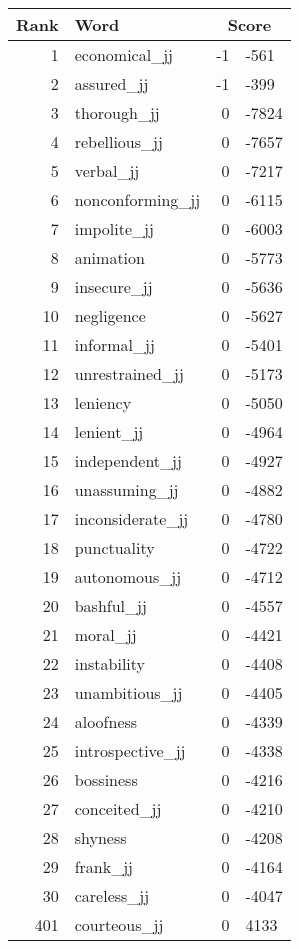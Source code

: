 \begin{longtable}[!htbp]{| rlr@{.}l |}
    \hline
    \textbf{Rank} & \textbf{Word} & \multicolumn{2}{c|}{\textbf{Score}} \\
    \hline
    \endhead
    1 & economical\_jj & -1 & -561 \\
    2 & assured\_jj & -1 & -399 \\
    3 & thorough\_jj & 0 & -7824 \\
    4 & rebellious\_jj & 0 & -7657 \\
    5 & verbal\_jj & 0 & -7217 \\
    6 & nonconforming\_jj & 0 & -6115 \\
    7 & impolite\_jj & 0 & -6003 \\
    8 & animation & 0 & -5773 \\
    9 & insecure\_jj & 0 & -5636 \\
    10 & negligence & 0 & -5627 \\
    11 & informal\_jj & 0 & -5401 \\
    12 & unrestrained\_jj & 0 & -5173 \\
    13 & leniency & 0 & -5050 \\
    14 & lenient\_jj & 0 & -4964 \\
    15 & independent\_jj & 0 & -4927 \\
    16 & unassuming\_jj & 0 & -4882 \\
    17 & inconsiderate\_jj & 0 & -4780 \\
    18 & punctuality & 0 & -4722 \\
    19 & autonomous\_jj & 0 & -4712 \\
    20 & bashful\_jj & 0 & -4557 \\
    21 & moral\_jj & 0 & -4421 \\
    22 & instability & 0 & -4408 \\
    23 & unambitious\_jj & 0 & -4405 \\
    24 & aloofness & 0 & -4339 \\
    25 & introspective\_jj & 0 & -4338 \\
    26 & bossiness & 0 & -4216 \\
    27 & conceited\_jj & 0 & -4210 \\
    28 & shyness & 0 & -4208 \\
    29 & frank\_jj & 0 & -4164 \\
    30 & careless\_jj & 0 & -4047 \\
    401 & courteous\_jj & 0 & 4133 \\

\end{longtable}
